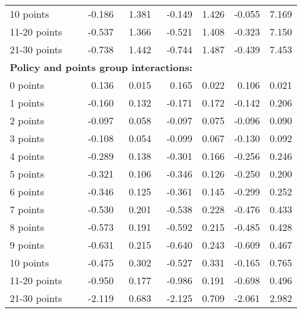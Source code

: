 \begin{table}
\begin{tabular}{l r r r r r r}
10 points  & -0.186  &  1.381  & -0.149  &  1.426  & -0.055  &  7.169   \\ 
 
11-20 points  & -0.537  &  1.366  & -0.521  &  1.408  & -0.323  &  7.150   \\ 
 
21-30 points  & -0.738  &  1.442  & -0.744  &  1.487  & -0.439  &  7.453   \\ 
 

\hline 
 
\multicolumn{4}{l}{\textbf{Policy and points group interactions:}}  \\ 
 
0 points  &  0.136  &  0.015  &  0.165  &  0.022  &  0.106  &  0.021   \\ 
 
1 points  & -0.160  &  0.132  & -0.171  &  0.172  & -0.142  &  0.206   \\ 
 
2 points  & -0.097  &  0.058  & -0.097  &  0.075  & -0.096  &  0.090   \\ 
 
3 points  & -0.108  &  0.054  & -0.099  &  0.067  & -0.130  &  0.092   \\ 
 
4 points  & -0.289  &  0.138  & -0.301  &  0.166  & -0.256  &  0.246   \\ 
 
5 points  & -0.321  &  0.106  & -0.346  &  0.126  & -0.250  &  0.200   \\ 
 
6 points  & -0.346  &  0.125  & -0.361  &  0.145  & -0.299  &  0.252   \\ 
 
7 points  & -0.530  &  0.201  & -0.538  &  0.228  & -0.476  &  0.433   \\ 
 
8 points  & -0.573  &  0.191  & -0.592  &  0.215  & -0.485  &  0.428   \\ 
 
9 points  & -0.631  &  0.215  & -0.640  &  0.243  & -0.609  &  0.467   \\ 
 
10 points  & -0.475  &  0.302  & -0.527  &  0.331  & -0.165  &  0.765   \\ 
 
11-20 points  & -0.950  &  0.177  & -0.986  &  0.191  & -0.698  &  0.496   \\ 
 
21-30 points  & -2.119  &  0.683  & -2.125  &  0.709  & -2.061  &  2.982   \\ 
 

\end{tabular}
\end{table}
